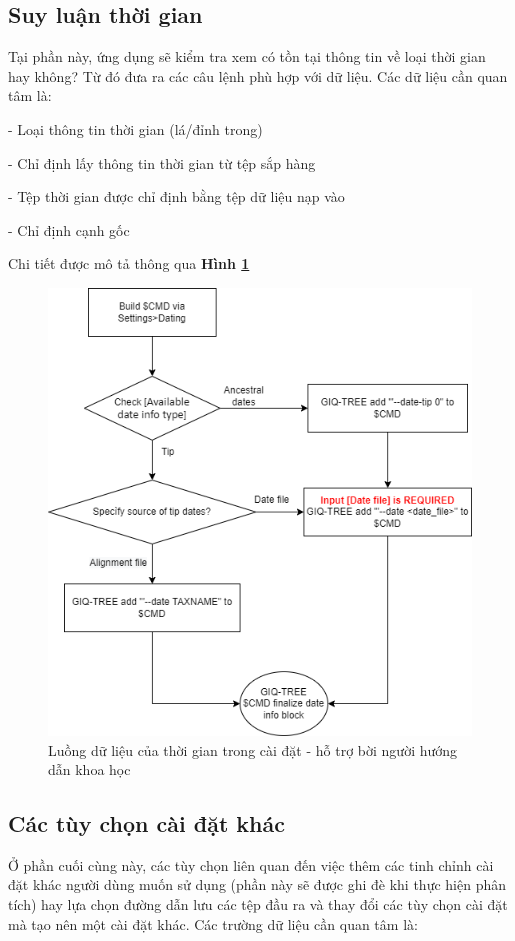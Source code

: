 \documentclass[12pt]{report}
\begin{document}
\subsection{Suy luận thời gian}
Tại phần này, ứng dụng sẽ kiểm tra xem có tồn tại thông tin về loại thời gian hay không? Từ đó đưa ra các câu lệnh phù hợp với dữ liệu. Các dữ liệu cần quan tâm là:

- Loại thông tin thời gian (lá/đỉnh trong)

- Chỉ định lấy thông tin thời gian từ tệp sắp hàng

- Tệp thời gian được chỉ định bằng tệp dữ liệu nạp vào

- Chỉ định cạnh gốc

 Chi tiết được mô tả thông qua  \textbf{Hình \ref{fig:image4.12}}

\begin{figure}[h]
	\centering
	\includegraphics[scale=0.8]{Image/4.12.png}
	\caption{Luồng dữ liệu của thời gian trong cài đặt - hỗ trợ bời người hướng dẫn khoa học }
	\label{fig:image4.12}
\end{figure}

\subsection{Các tùy chọn cài đặt khác}
Ở phần cuối cùng này, các tùy chọn liên quan đến việc thêm các tinh chỉnh cài đặt khác người dùng muốn sử dụng (phần này sẽ được ghi đè khi thực hiện phân tích) hay lựa chọn đường dẫn lưu các tệp đầu ra và thay đổi các tùy chọn cài đặt mà tạo nên một cài đặt khác. Các trường dữ liệu cần quan tâm là:
\end{document}
